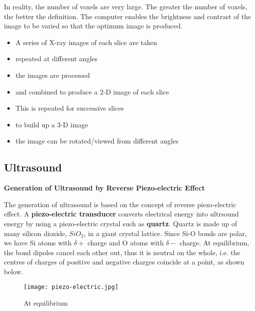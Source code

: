 \documentclass{article}
\begin{document}
In reality, the number of voxels are very large. The greater the number of voxels, the better the definition. The computer enables the brightness and contrast of the image to be varied so that the optimum image is produced.
\newline
\begin{tcolorbox}[colframe=black!20!white,title=
\textcolor{red}{****Explain the principles of CT scanning. (6m)}]
\begin{itemize}
\color{red}
    \item A series of X-ray images of each slice are taken
    \item repeated at different angles
    \item the images are processed
    \item and combined to produce a 2-D image of each slice
    \item This is repeated for successive slices
    \item to build up a 3-D image
    \item the image can be rotated/viewed from different angles
\end{itemize}
\end{tcolorbox}

\subsection{Ultrasound}

\begin{flushleft}
\textbf{Generation of Ultrasound by Reverse Piezo-electric Effect}
\end{flushleft}

The generation of ultrasound is based on the concept of reverse piezo-electric effect. A \textbf{piezo-electric transducer} converts electrical energy into ultrsound energy by using a piezo-electric crystal such as \textbf{quartz}. Quartz is made up of many silicon dioxide, $SiO_2$, in a giant crystal lattice. Since Si-O bonds are polar, we have Si atoms with $\delta +$ charge and O atoms with $\delta -$ charge. At equilibrium, the bond dipoles cancel each other out, thus it is neutral on the whole, i.e. the centres of charges of positive and negative charges coincide at a point, as shown below.

\begin{figure}[H]
    \centering
    \texttt{[image: piezo-electric.jpg]}
    \caption*{At equilibrium}
    \label{fig:my_label}
\end{figure}
\end{document}
